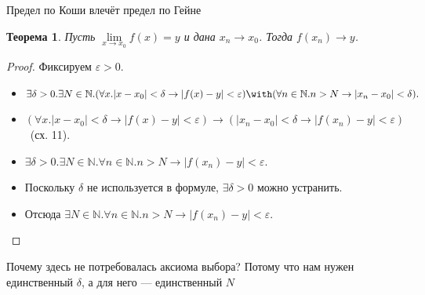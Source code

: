 \documentclass[aspectratio=169]{beamer}
\newtheorem{thm}{Теорема}[section]
\begin{document}
\begin{frame}{Предел по Коши влечёт предел по Гейне}
\begin{thm}Пусть $\lim\limits_{x \rightarrow x_0} f(x) = y$ и дана $x_n \rightarrow x_0$.
Тогда $f(x_n) \rightarrow y$.\end{thm}

\begin{proof}
Фиксируем $\varepsilon > 0$.
\begin{itemize}
\item $\exists \delta > 0.\exists N\in\mathbb{N}.(\forall x.|x - x_0| < \delta \rightarrow |f(x) - y| < \varepsilon) \with
(\forall n\in\mathbb{N}.n > N \rightarrow |x_n - x_0|<\delta).$
\item $(\forall x.|x - x_0| < \delta \rightarrow |f(x) - y| < \varepsilon) \rightarrow (|x_n - x_0| < \delta \rightarrow |f(x_n) - y| < \varepsilon)$ \ (сх. 11).
\item $\exists \delta > 0.\exists N\in\mathbb{N}.\forall n\in\mathbb{N}.n > N\rightarrow |f(x_n) - y| < \varepsilon$.
\item Поскольку $\delta$ не используется в формуле, $\exists \delta > 0$ можно устранить.
\item Отсюда $\exists N\in\mathbb{N}.\forall n\in\mathbb{N}.n > N\rightarrow |f(x_n) - y| < \varepsilon.$
\end{itemize}
\end{proof}\pause

Почему здесь не потребовалась аксиома выбора? Потому что нам нужен единственный $\delta$, а для него --- 
единственный $N$

\end{frame}
\end{document}

